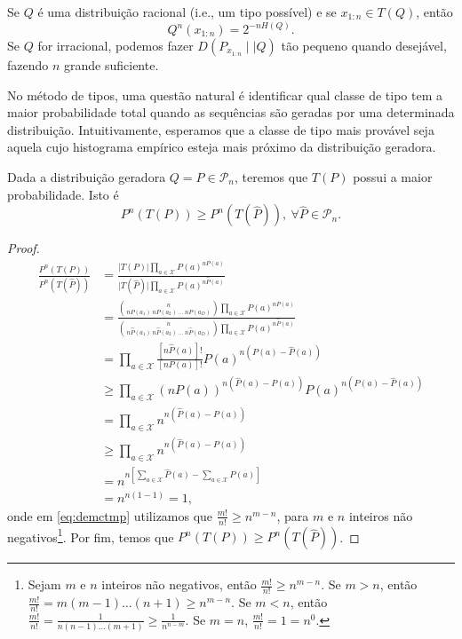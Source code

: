 Se $Q$ é uma distribuição racional (i.e., um tipo possível) e se $x_{1:n} \in T(Q)$, então
\begin{equation}
Q^n(x_{1:n}) = 2^{-n H(Q)} .
\end{equation}
Se $Q$ for irracional, podemos fazer $D(P_{x_{1:n}} \mid \mid Q)$  tão pequeno quando desejável,
fazendo $n$ grande suficiente.

No método de tipos, uma questão natural é identificar qual classe de tipo
tem a maior probabilidade total quando as sequências são geradas por uma 
determinada distribuição. Intuitivamente, esperamos que a classe de tipo
mais provável seja aquela cujo histograma empírico esteja mais próximo 
da distribuição geradora.

\begin{lemma}
Dada a distribuição geradora $Q = P \in \mathcal{P}_n$, teremos que $T(P)$ possui a maior probabilidade. Isto é
\begin{equation}
  P^n(T(P)) \geq P^n(T(\hat{P})) , \ \forall \hat{P} \in \mathcal{P}_n .
\end{equation}
\end{lemma}
\begin{proof}
  \begin{subequations}
  \begin{align}
  \frac{P^n(T(P))}{P^n(T(\hat{P}))} &= \frac{\vert T(P) \vert \prod_{a \in \mathcal{X}} P(a)^{nP(a)} }{ \vert T(\hat{P}) \vert \prod_{a \in \mathcal{X}} P(a)^{n\hat{P}(a)}  } \\
        &= \frac{ { n \choose nP(a_1) \ nP(a_2) \ \ldots \ nP(a_D) } \prod_{a \in \mathcal{X}} P(a)^{nP(a)} }{ { n \choose n\hat{P}(a_1) \ n\hat{P}(a_2) \ \ldots \ n\hat{P}(a_D) } \prod_{a \in \mathcal{X}} P(a)^{n\hat{P}(a)}  } \\
        &= \prod_{a \in \mathcal{X}} \frac{ [n\hat{P}(a)]! }{[nP(a)]!} P(a)^{n(P(a)-\hat{P}(a))} \\
	&\geq \prod_{a \in \mathcal{X}} (nP(a))^{n(\hat{P}(a)-P(a))} P(a)^{n(P(a)-\hat{P}(a))} \label{eq:demctmp}\\
        &= \prod_{a \in \mathcal{X}} n^{n(\hat{P}(a)-P(a))} \\
	&\geq \prod_{a \in \mathcal{X}} n^{n(\hat{P}(a)-P(a))} \\
        &= n^{n\left[ \sum_{a \in \mathcal{X}} \hat{P}(a) - \sum_{a \in \mathcal{X}} P(a) \right]} \\
        &= n^{n(1-1)} = 1 ,
  \end{align}
  \end{subequations}
  onde em \ref{eq:demctmp} utilizamos que $\frac{m!}{n!} \geq n^{m-n}$, para $m$ e $n$ inteiros não negativos\footnote{
    Sejam $m$ e $n$ inteiros não negativos, então $\frac{m!}{n!} \geq n^{m-n}$.
    Se $m>n$, então $\frac{m!}{n!} = m(m-1) \ldots (n+1) \geq n^{m-n}$.
    Se $m<n$, então $\frac{m!}{n!} = \frac{1}{n(n-1)\ldots(m+1)} \geq \frac{1}{n^{n-m}}$.
    Se $m=n$, $\frac{m!}{n!} = 1 = n^0$.
  }.
  Por fim, temos que $P^n(T(P)) \geq P^n(T(\hat{P}))$.
\end{proof}


